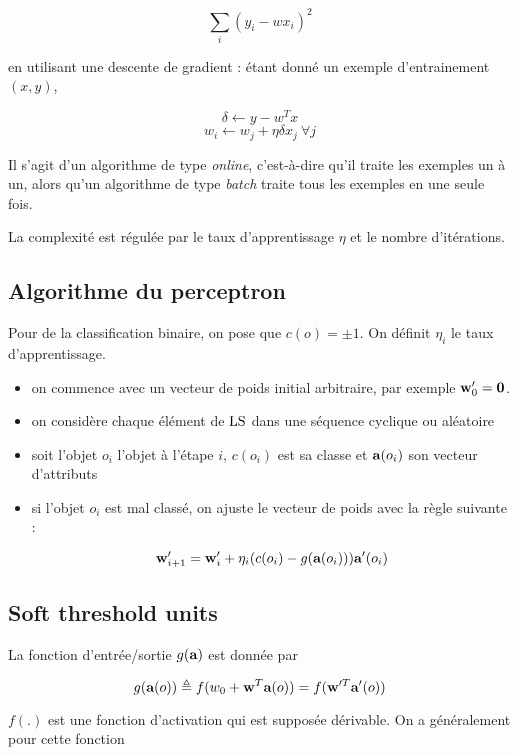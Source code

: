 $$\sum_i (y_i - wx_i)^2$$

en utilisant une descente de gradient : étant donné un exemple d'entrainement $(x, y)$,

$$\delta \leftarrow y - w^Tx$$
$$w_i \leftarrow w_j + \eta \delta x_j \: \forall j$$

Il s'agit d'un algorithme de type \textit{online}, c'est-à-dire qu'il traite les exemples un à un, alors qu'un algorithme de type \textit{batch} traite tous les exemples en une seule fois.

La complexité est régulée par le taux d'apprentissage $\eta$ et le nombre d'itérations.

	\subsection{Algorithme du perceptron}
	
	Pour de la classification binaire, on pose que $c(o) = \pm 1$. On définit $\eta_i$ le taux d'apprentissage.
	
	\begin{itemize}
		\item on commence avec un vecteur de poids initial arbitraire, par exemple $\textbf{w}_0' = \textbf{0}$.
		\item on considère chaque élément de $\text{LS}$ dans une séquence cyclique ou aléatoire
		
		\item soit l'objet $o_i$ l'objet à l'étape $i$, $c(o_i)$ est sa classe et $\textbf{a}(o_i)$ son vecteur d'attributs
		\item si l'objet $o_i$ est mal classé, on ajuste le vecteur de poids avec la règle suivante :
		
		$$\textbf{w}_{i + 1}' = \textbf{w}_i' + \eta_i (c(o_i) - g(\textbf{a}(o_i))) \textbf{a}'(o_i)$$
	\end{itemize}
	
	
	\subsection{Soft threshold units}
	
	La fonction d'entrée/sortie $g(\textbf{a})$ est donnée par
	
	$$g(\textbf{a}(o)) \triangleq f(w_0 + \textbf{w}^T\textbf{a}(o)) = f(\textbf{w}'^T \textbf{a}'(o))$$
	
	$f(.)$ est une fonction d'activation qui est supposée dérivable. On a généralement pour cette fonction
	
